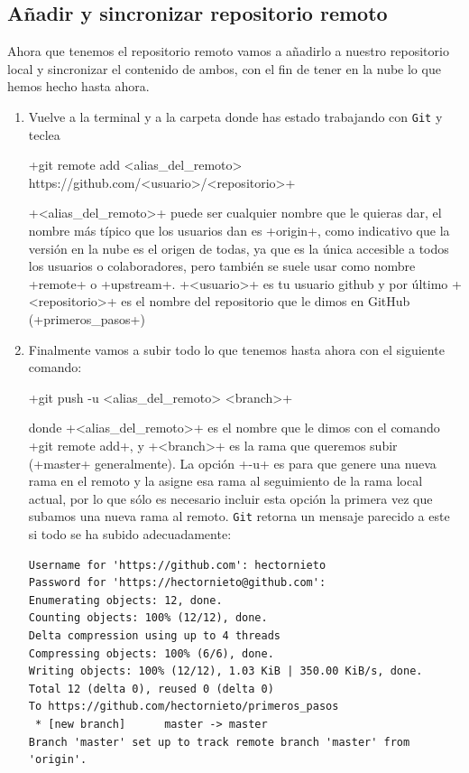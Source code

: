 \documentclass[a5paper,10pt]{article}
\begin{document}
    \subsection{Añadir y sincronizar repositorio remoto}\label{sec:sincronizar}
      Ahora que tenemos el repositorio remoto vamos a añadirlo a nuestro repositorio local y sincronizar el contenido de ambos, con el fin de tener en la nube lo que hemos hecho hasta ahora. 
      \begin{enumerate}
       \item Vuelve a la terminal y a la carpeta donde has estado trabajando con \verb+Git+ y teclea

        \hspace{-3cm}\cverb+git remote add <alias_del_remoto> https://github.com/<usuario>/<repositorio>+
       
       \cverb+<alias_del_remoto>+ puede ser cualquier nombre que le quieras dar, el nombre más típico que los usuarios dan es \cverb+origin+, como indicativo que la versión en la nube es el origen de todas, ya que es la única accesible a todos los usuarios o colaboradores, pero también se suele usar como nombre \cverb+remote+ o \cverb+upstream+. \cverb+<usuario>+ es tu usuario github y por último \cverb+<repositorio>+ es el nombre del repositorio que le dimos en GitHub (\cverb+primeros_pasos+)
       
       \item Finalmente vamos a subir todo lo que tenemos hasta ahora con el siguiente comando:
       
       \cverb+git push -u <alias_del_remoto> <branch>+
       
       donde \cverb+<alias_del_remoto>+ es el nombre que le dimos con el comando \cverb+git remote add+, y \cverb+<branch>+ es la rama que queremos subir (\cverb+master+ generalmente). La opción \cverb+-u+ es para que genere una nueva rama en el remoto y la asigne esa rama al seguimiento de la rama local actual, por lo que sólo es necesario incluir esta opción la primera vez que subamos una nueva rama al remoto. \verb+Git+ retorna un mensaje parecido a este si todo se ha subido adecuadamente:
       \begin{lstlisting}[style=custom]
Username for 'https://github.com': hectornieto
Password for 'https://hectornieto@github.com': 
Enumerating objects: 12, done.
Counting objects: 100% (12/12), done.
Delta compression using up to 4 threads
Compressing objects: 100% (6/6), done.
Writing objects: 100% (12/12), 1.03 KiB | 350.00 KiB/s, done.
Total 12 (delta 0), reused 0 (delta 0)
To https://github.com/hectornieto/primeros_pasos
 * [new branch]      master -> master
Branch 'master' set up to track remote branch 'master' from 'origin'.
      \end{lstlisting}
      

\end{enumerate}
\end{document}
